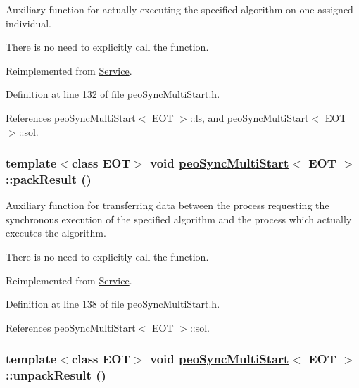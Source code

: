 Auxiliary function for actually executing the specified algorithm on one assigned individual. 

There is no need to explicitly call the function. 

Reimplemented from \hyperlink{classService_e4f2894e6121e60f38d41cfbd7447ae4}{Service}.

Definition at line 132 of file peo\-Sync\-Multi\-Start.h.

References peo\-Sync\-Multi\-Start$<$ EOT $>$::ls, and peo\-Sync\-Multi\-Start$<$ EOT $>$::sol.\hypertarget{classpeoSyncMultiStart_6c48eb0dae741cff7203b65e226f9616}{
\subsubsection[packResult]{\setlength{\rightskip}{0pt plus 5cm}template$<$class EOT$>$ void \hyperlink{classpeoSyncMultiStart}{peo\-Sync\-Multi\-Start}$<$ EOT $>$::pack\-Result ()}}
\label{classpeoSyncMultiStart_6c48eb0dae741cff7203b65e226f9616}


Auxiliary function for transferring data between the process requesting the synchronous execution of the specified algorithm and the process which actually executes the algorithm. 

There is no need to explicitly call the function. 

Reimplemented from \hyperlink{classService_e5e4f90b2315e15c2a2913bd370f4cf5}{Service}.

Definition at line 138 of file peo\-Sync\-Multi\-Start.h.

References peo\-Sync\-Multi\-Start$<$ EOT $>$::sol.\hypertarget{classpeoSyncMultiStart_c3cbd1f10a89d1915c5ccf82a2c34a1d}{
\subsubsection[unpackResult]{\setlength{\rightskip}{0pt plus 5cm}template$<$class EOT$>$ void \hyperlink{classpeoSyncMultiStart}{peo\-Sync\-Multi\-Start}$<$ EOT $>$::unpack\-Result ()}}
\label{classpeoSyncMultiStart_c3cbd1f10a89d1915c5ccf82a2c34a1d}


